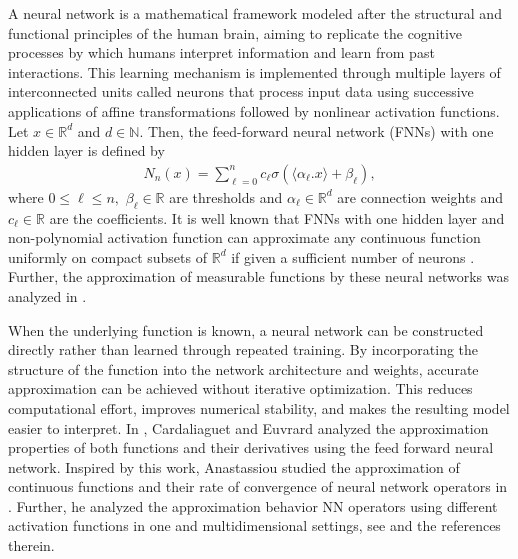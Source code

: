 \documentclass[12pt, reqno]{amsart}
\numberwithin{equation}{section}
\theoremstyle{definition}
\theoremstyle{remark}
\numberwithin{equation}{section}
\newcommand{\R}{\mathbb{R}}
\begin{document}
 A neural network is a mathematical framework modeled after the structural and functional principles of the human brain, aiming to replicate the cognitive processes by which humans interpret information and learn from past interactions. This learning mechanism is implemented through multiple layers of interconnected units called  neurons that process input data using successive applications of affine transformations followed by nonlinear activation functions.
Let $x\in \mathbb{R}^d$ and $d\in\mathbb{N}$. Then, the feed-forward neural network (FNNs) with one hidden layer is defined by 
\begin{eqnarray*}
N_{n}(x)=\displaystyle\sum_{\ell=0}^{n}c_{\ell}\sigma(\langle\alpha_{\ell}.x\rangle+\beta_{\ell}),
\end{eqnarray*}
where $0\leq\ell\leq n,$ $\beta_{\ell}\in\mathbb{R}$ are thresholds and $\alpha_{\ell}\in \mathbb{R}^d$ are connection weights and $c_{\ell}\in \mathbb{R}$ are the coefficients. It is well known that FNNs with one hidden layer and non-polynomial activation function can approximate any continuous function uniformly on compact subsets of $\R^d$ if given a sufficient number of neurons \cite{Cybenko}. Further, the approximation of measurable functions by these neural networks was analyzed in \cite{Hornik}.\par
  When the underlying function is known, a neural network can be constructed directly rather than learned through repeated training. By incorporating the structure of the function into the network architecture and weights, accurate approximation can be achieved without iterative optimization. This reduces computational effort, improves numerical stability, and makes the resulting model easier to interpret. 
 In \cite{carda}, Cardaliaguet and Euvrard analyzed the approximation properties of both functions and their derivatives using the feed forward neural network. Inspired by this work, Anastassiou studied the approximation of continuous functions and their rate of convergence of neural network operators in \cite{Anas1}. Further, he analyzed the approximation behavior NN operators using different activation functions in one and multidimensional settings, see \cite{Anas2, Anas3, GAA1, GAA2, GAA3} and the references therein. 
\end{document}
